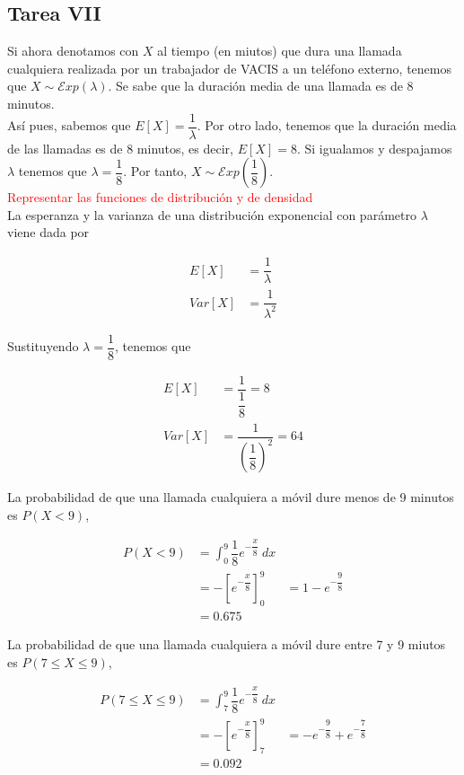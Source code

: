\documentclass[12pt,a4paper,twoside,openright,titlepage,final]{article}
\begin{document}
\subsection{Tarea VII}

Si ahora denotamos con $X$ al tiempo (en miutos) que dura una llamada cualquiera realizada por un trabajador de VACIS a un teléfono externo, tenemos que $X \sim \mathcal{E}xp(\lambda)$. Se sabe que la duración media de una llamada es de 8 minutos.\\

Así pues, sabemos que $E[X] = \dfrac{1}{\lambda}$. Por otro lado, tenemos que la duración media de las llamadas es de 8 minutos, es decir, $E[X] = 8$. Si igualamos y despajamos $\lambda$ tenemos que $\lambda = \dfrac{1}{8}$. Por tanto, $X \sim \mathcal{E}xp(\dfrac{1}{8})$.\\

\textcolor{red}{Representar las funciones de distribución y de densidad}\\

La esperanza y la varianza de una distribución exponencial con parámetro $\lambda$ viene dada por

\begin{align*}
E[X] & = \dfrac{1}{\lambda} \\
Var[X] & = \dfrac{1}{\lambda^2}
\end{align*}

Sustituyendo $\lambda  = \dfrac{1}{8}$, tenemos que

\begin{align*}
E[X] & = \dfrac{1}{\dfrac{1}{8}} = 8 \\
Var[X] & = \dfrac{1}{\left(\dfrac{1}{8}\right)^2} = 64
\end{align*}

La probabilidad de que una llamada cualquiera a móvil dure menos de 9 minutos es $P(X < 9)$,

\begin{align*}
P(X < 9) & = \int_{0}^{9} \dfrac{1}{8} e^{-\dfrac{x}{8}} \ dx \\
& = -\left[ e^{-\dfrac{x}{8}} \right]_0^9
& = 1 - e^{-\dfrac{9}{8}} \\
& = 0.675
\end{align*}

La probabilidad de que una llamada cualquiera a móvil dure entre 7 y 9 miutos es $P(7 \leq X \leq 9)$,

\begin{align*}
P(7 \leq X \leq 9) & = \int_{7}^{9} \dfrac{1}{8} e^{-\dfrac{x}{8}} \ dx \\
& = -\left[ e^{-\dfrac{x}{8}} \right]_7^9
& = -e^{-\dfrac{9}{8}} + e^{-\dfrac{7}{8}} \\
& = 0.092
\end{align*}
\end{document}
